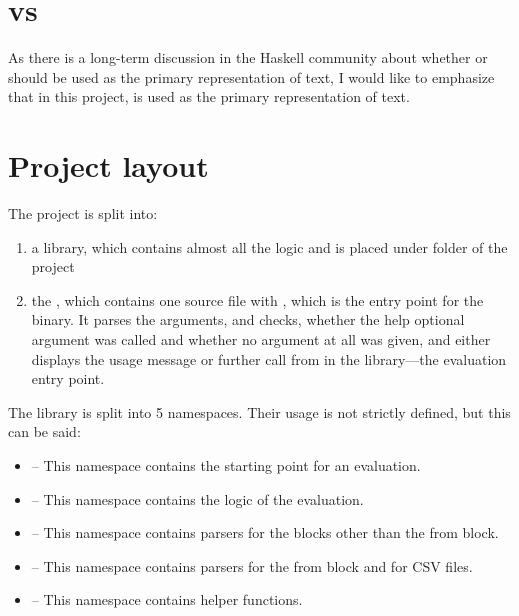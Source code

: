 \section{ vs }
As there is a long-term discussion in the Haskell community about whether  or  should be used as the 
primary representation of text, I would like to emphasize that in this project,  is used as the primary
representation of text.

\section{Project layout}

The project is split into:
\begin{enumerate}
  \item a library, which contains almost all the logic and is placed under
        folder of the project

  \item the , which contains one source file
      with , which is the entry point for the  binary. 
      It parses the arguments, and checks, whether the help optional argument was called and whether no argument at all was given, 
     and either displays the usage message or further call  from  in the library---the evaluation entry point.
\end{enumerate}

The library is split into 5 namespaces. Their usage is not strictly defined, but this can be said:
\begin{itemize}
    \item {} -- This namespace contains the starting point for an  evaluation.
    \item {} -- This namespace contains the logic of the evaluation.
    \item {} -- This namespace contains parsers for the blocks other than the from block.
    \item {} -- This namespace contains parsers for the from block and for CSV files.
    \item {} -- This namespace contains helper functions.
\end{itemize}


